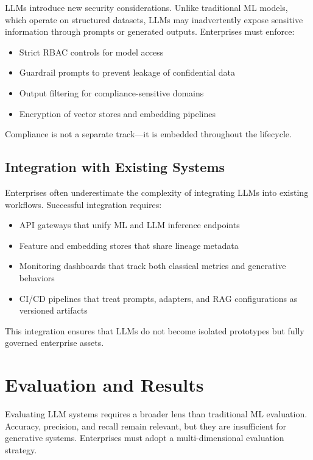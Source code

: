 \documentclass[11pt]{article}
\begin{document}
LLMs introduce new security considerations. Unlike traditional ML models, which operate on structured datasets, LLMs may inadvertently expose sensitive information through prompts or generated outputs. Enterprises must enforce:

\begin{itemize}[leftmargin=1.2cm]
    \item Strict RBAC controls for model access
    \item Guardrail prompts to prevent leakage of confidential data
    \item Output filtering for compliance-sensitive domains
    \item Encryption of vector stores and embedding pipelines
\end{itemize}

Compliance is not a separate track—it is embedded throughout the lifecycle.

\subsection{Integration with Existing Systems}

Enterprises often underestimate the complexity of integrating LLMs into existing workflows. Successful integration requires:

\begin{itemize}[leftmargin=1.2cm]
    \item API gateways that unify ML and LLM inference endpoints
    \item Feature and embedding stores that share lineage metadata
    \item Monitoring dashboards that track both classical metrics and generative behaviors
    \item CI/CD pipelines that treat prompts, adapters, and RAG configurations as versioned artifacts
\end{itemize}

This integration ensures that LLMs do not become isolated prototypes but fully governed enterprise assets.

\section{Evaluation and Results}

Evaluating LLM systems requires a broader lens than traditional ML evaluation. Accuracy, precision, and recall remain relevant, but they are insufficient for generative systems. Enterprises must adopt a multi-dimensional evaluation strategy.
\end{document}
